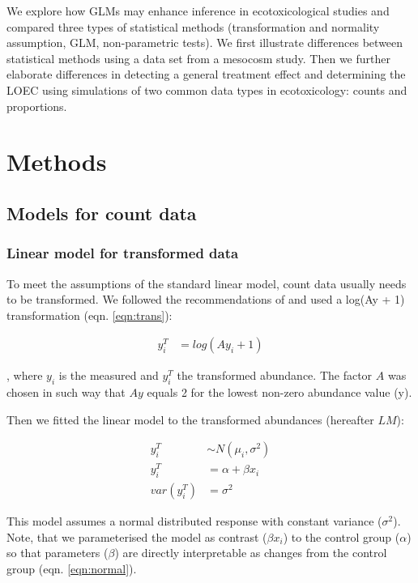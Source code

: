 \documentclass[twocolumn, natbib]{svjour3}
\begin{document}
We explore how GLMs may enhance inference in ecotoxicological studies and compared three types of statistical methods (transformation and normality assumption, GLM, non-parametric tests).
We first illustrate differences between statistical methods using a data set from a mesocosm study.
Then we further elaborate differences in detecting a general treatment effect and determining the LOEC using simulations of two common data types in ecotoxicology: counts and proportions. 



\section{Methods}
\label{sec:methods}

\subsection{Models for count data}
\subsubsection{Linear model for transformed data}
To meet the assumptions of the standard linear model, count data usually needs to be transformed. 
We followed the recommendations of \citet{van_den_brink_impact_2000} and used a log(Ay + 1) transformation (eqn. \ref{eqn:trans}):

\begin{align}
  y^T_i & = log(Ay_i + 1) \label{eqn:trans}
\end{align}

, where $y_i$ is the measured and $y_i^T$ the transformed abundance. 
The factor $A$ was chosen in such way that $Ay$ equals 2 for the lowest non-zero abundance value (y).

Then we fitted the linear model to the transformed abundances (hereafter $LM$):

\begin{align}
  y_i^T &\sim N(\mu_i, \sigma^2) \nonumber \\
  y_i^T &= \alpha + \beta x_i \label{eqn:normal} \\
  var(y_i^T) &= \sigma^2 \nonumber
\end{align}

This model assumes a normal distributed response with constant variance ($\sigma^2$).
Note, that we parameterised the model as contrast ($\beta x_i$) to the control group ($\alpha$) so that parameters ($\beta$) are directly interpretable as changes from the control group (eqn. \ref{eqn:normal}).
\end{document}
